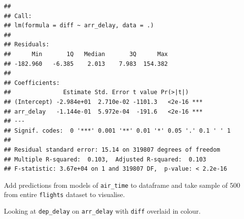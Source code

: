 \documentclass[]{book}
\newenvironment{Shaded}{\begin{snugshade}}{\end{snugshade}}
\newcommand{\DataTypeTok}[1]{\textcolor[rgb]{0.13,0.29,0.53}{#1}}
\newcommand{\DecValTok}[1]{\textcolor[rgb]{0.00,0.00,0.81}{#1}}
\newcommand{\KeywordTok}[1]{\textcolor[rgb]{0.13,0.29,0.53}{\textbf{#1}}}
\newcommand{\NormalTok}[1]{#1}
\newcommand{\OperatorTok}[1]{\textcolor[rgb]{0.81,0.36,0.00}{\textbf{#1}}}
\newcommand{\StringTok}[1]{\textcolor[rgb]{0.31,0.60,0.02}{#1}}
\theoremstyle{definition}
\theoremstyle{definition}
\theoremstyle{definition}
\theoremstyle{remark}
\begin{document}
\begin{verbatim}
## 
## Call:
## lm(formula = diff ~ arr_delay, data = .)
## 
## Residuals:
##      Min       1Q   Median       3Q      Max 
## -182.960   -6.385    2.013    7.983  154.382 
## 
## Coefficients:
##               Estimate Std. Error t value Pr(>|t|)    
## (Intercept) -2.984e+01  2.710e-02 -1101.3   <2e-16 ***
## arr_delay   -1.144e-01  5.972e-04  -191.6   <2e-16 ***
## ---
## Signif. codes:  0 '***' 0.001 '**' 0.01 '*' 0.05 '.' 0.1 ' ' 1
## 
## Residual standard error: 15.14 on 319807 degrees of freedom
## Multiple R-squared:  0.103,  Adjusted R-squared:  0.103 
## F-statistic: 3.67e+04 on 1 and 319807 DF,  p-value: < 2.2e-16
\end{verbatim}

Add predictions from models of \texttt{air\_time} to dataframe and take
sample of 500 from entire \texttt{flights} dataset to visualise.

\begin{Shaded}
\end{Shaded}

Looking at \texttt{dep\_delay} on \texttt{arr\_delay} with \texttt{diff}
overlaid in colour.

\begin{Shaded}
\end{Shaded}
\end{document}
